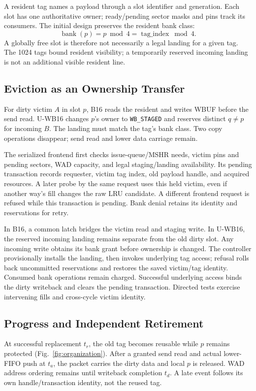 \documentclass[conference,letterpaper]{IEEEtran}
\begin{document}
A resident tag names a payload through a slot identifier and generation. Each slot has one authoritative owner; ready/pending sector masks and pins track its consumers. The initial design preserves the resident bank class:
\begin{equation}
 \operatorname{bank}(p)=p\bmod4=\operatorname{tag\_index}\bmod4.
\label{eq:bank}
\end{equation}
A globally free slot is therefore not necessarily a legal landing for a given tag. The 1024 tags bound resident visibility; a temporarily reserved incoming landing is not an additional visible resident line.

\subsection{Eviction as an Ownership Transfer}
For dirty victim $A$ in slot $p$, B16 reads the resident and writes WBUF before the send read. U-WB16 changes $p$'s owner to \texttt{WB\_STAGED} and reserves distinct $q\ne p$ for incoming $B$. The landing must match the tag's bank class. Two copy operations disappear; send read and lower data carriage remain.

The serialized frontend first checks issue-queue/MSHR needs, victim pins and pending sectors, WAD capacity, and legal staging/landing availability. Its pending transaction records requester, victim tag index, old payload handle, and acquired resources. A later probe by the same request uses this held victim, even if another way's fill changes the raw LRU candidate. A different frontend request is refused while this transaction is pending. Bank denial retains its identity and reservations for retry.

In B16, a common latch bridges the victim read and staging write. In U-WB16, the reserved incoming landing remains separate from the old dirty slot. Any incoming write obtains its bank grant before ownership is changed. The controller provisionally installs the landing, then invokes underlying tag access; refusal rolls back uncommitted reservations and restores the saved victim/tag identity. Consumed bank operations remain charged. Successful underlying access binds the dirty writeback and clears the pending transaction. Directed tests exercise intervening fills and cross-cycle victim identity.

\subsection{Progress and Independent Retirement}
At successful replacement $t_r$, the old tag becomes reusable while $p$ remains protected (Fig.~\ref{fig:organization}). After a granted send read and actual lower-FIFO push at $t_a$, the packet carries the dirty data and local $p$ is released. WAD address ordering remains until writeback completion $t_d$. A late event follows its own handle/transaction identity, not the reused tag.
\end{document}
